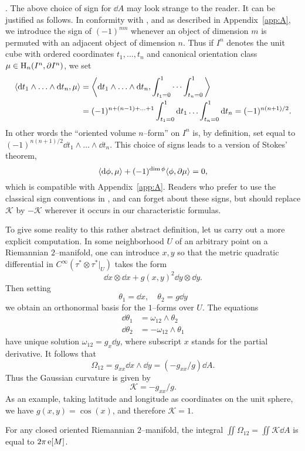 \documentclass[../main]{subfiles}
\begin{document}
. The above choice of sign for $\dd A$ may look strange to the reader. It can be justified as follows. In conformity with \cite{maclane_1975}, and as described in Appendix~\ref{app:A}, we introduce the sign of $(-1)^{mn}$ whenever an object of dimension $m$ is permuted with an adjacent object of dimension $n$. Thus if $I^n$ denotes the unit cube with ordered coordinates $t_1, \ldots, t_n$ and canonical orientation class $\mu \in \operatorname{H}_n(I^n, \partial I^n)$, we set 
\begin{align*}
\langle\mathrm{d} t_1 \wedge \ldots \wedge \mathrm{d} t_n,\mu\rangle & = \bigg\langle\mathrm{d} t_1 \wedge \ldots \wedge \mathrm{d} t_n,\int_{t_1 = 0}^1 \cdots \int_{t_n = 0}^1\bigg\rangle \\ & = (-1)^{n + (n - 1) + \ldots + 1} \int_{t_1 = 0}^1 \mathrm{d} t_1 \ldots \int_{t_n = 0}^1 \mathrm{d} t_n = (-1)^{n(n + 1)/2}.
\end{align*}
In other words the ``oriented volume $n$--form'' on $I^n$ is, by definition, set equal to $(-1)^{n(n + 1)/2} \dd t_1 \wedge \ldots \wedge \dd t_n$. This choice of signs leads to a version of Stokes' theorem, \[\langle\mathrm{d} \phi,\mu\rangle + (-1)^{\dim \phi} \langle\phi,\partial \mu\rangle = 0,\] which is compatible with Appendix~\ref{app:A}. Readers who prefer to use the classical sign conventions in \cite{spanier1981}, \cite{warner2013foundations} and \cite{bott-chern} can forget about these signs, but should replace $\mathcal K$ by $-\mathcal K$ wherever it occurs in our characteristic formulas. 

 To give some reality to this rather abstract definition, let us carry out a more explicit computation. In some neighborhood $U$ of an arbitrary point on a Riemannian $2$--manifold, one can introduce  $x, y$ so that the metric quadratic differential in $C^\infty(\tau^\ast \otimes \tau^\ast|_U)$ takes the form 
 \[\dd x \otimes \dd x + g(x, y)^2 \dd y \otimes \dd y.\] Then setting \[\theta_1 = \dd x, \quad \theta_2 = g \dd y\] we obtain an orthonormal basis for the $1$--forms over $U$. The equations
\begin{align*}
\dd  \theta_1 & = \omega_{12} \wedge \theta_2 \\ \dd  \theta_2 & = -\omega_{12} \wedge \theta_1
\end{align*}
have unique solution $\omega_{12} = g_x \dd y$, where subscript $x$ stands for the partial derivative. It follows that \[\Omega_{12} = g_{xx} \dd x \wedge \dd y = (-g_{xx}/g) \dd A.\] Thus the Gaussian curvature is given by \[\mathcal K = -g_{xx}/g.\] As an example, taking latitude and longitude as coordinates on the unit sphere, we have $g(x, y) = \cos(x)$, and therefore $\mathcal K = 1$. 
\begin{theorem*}
For any closed oriented Riemannian $2$--manifold, the integral $\iint \Omega_{12} = \iint \mathcal K \dd A$ is equal to $2 \pi \operatorname{e}[M]$.
\end{theorem*}
\end{document}

